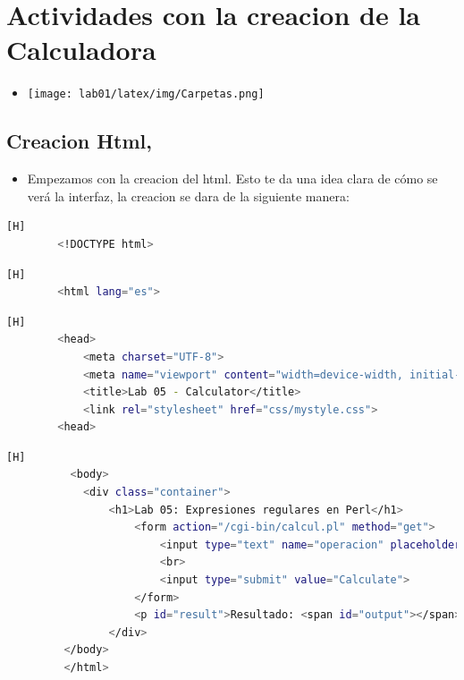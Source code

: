 \documentclass{article}
\begin{document}
	\section{Actividades con la creacion de la Calculadora}
            \begin{itemize}
                \item [] \texttt{[image: lab01/latex/img/Carpetas.png]}
            \end{itemize}
	
	\subsection{Creacion Html,}
	\begin{itemize}
        \item Empezamos con la creacion del html. Esto te da una idea clara de cómo se       verá la interfaz, la creacion se dara de la siguiente manera:
        \end{itemize}
	
		
	\begin{lstlisting}[language=bash,caption={Aviso que le dice al navegador que este documento es una página web en HTML5.}][H]
		<!DOCTYPE html>
	\end{lstlisting}
	\begin{lstlisting}[language=bash,caption={Etiqueta que envuelve todo el contenido de la página; indica al navegador que el idioma es español.}][H]
		<html lang="es">
	\end{lstlisting}	
	\begin{lstlisting}[language=bash,caption={Esta sección configura las bases para el funcionamiento y la presentación de la página web, asegurando que sea accesible y visualmente atractiva en diferentes dispositivos.}][H]
        <head>
            <meta charset="UTF-8">
            <meta name="viewport" content="width=device-width, initial-scale=1.0">
            <title>Lab 05 - Calculator</title>
            <link rel="stylesheet" href="css/mystyle.css">
        <head>

	\end{lstlisting}
	\begin{lstlisting}[language=bash,caption={Esta sección define el contenido visible de la página, permitiendo a los usuarios ingresar una operación matemática, enviar el formulario y ver el resultado. Está diseñada para ser facil de usar.}][H]
	      <body>
            <div class="container">
                <h1>Lab 05: Expresiones regulares en Perl</h1>
                    <form action="/cgi-bin/calcul.pl" method="get">
                        <input type="text" name="operacion" placeholder="operacion" required>
                        <br>
                        <input type="submit" value="Calculate">
                    </form>
                    <p id="result">Resultado: <span id="output"></span></p>
                </div>
         </body>
         </html>
	\end{lstlisting}
	
\end{document}
